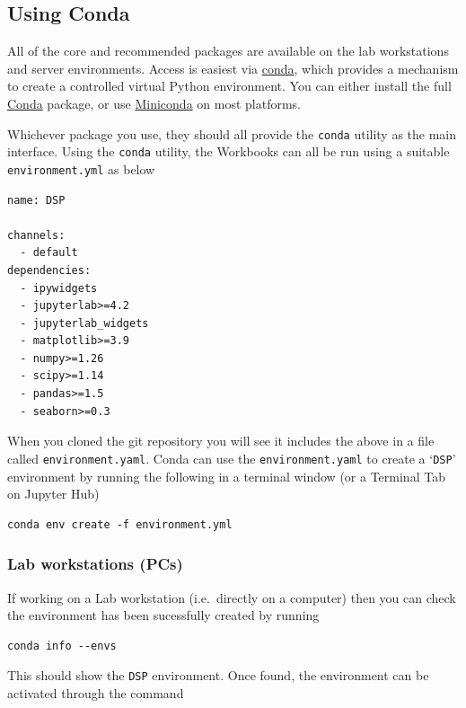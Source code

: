 \subsection{Using Conda}

All of the core and recommended packages are available on the lab
workstations and server environments. Access is easiest via
\href{https://anaconda.org/anaconda/conda}{conda}, which provides a
mechanism to create a controlled virtual Python environment. You can
either install the full
\href{https://docs.conda.io/projects/conda/en/latest/index.html}{Conda}
package, or use
\href{https://www.anaconda.com/docs/getting-started/miniconda/install}{Miniconda}
on most platforms.

Whichever package you use, they should all provide the \texttt{conda}
utility as the main interface. Using the \texttt{conda} utility, the
Workbooks can all be run using a suitable \texttt{environment.yml} as
below

\begin{verbatim}
name: DSP
 
channels:
  - default
dependencies:
  - ipywidgets
  - jupyterlab>=4.2
  - jupyterlab_widgets
  - matplotlib>=3.9
  - numpy>=1.26
  - scipy>=1.14
  - pandas>=1.5
  - seaborn>=0.3
\end{verbatim}

When you cloned the git repository you will see it includes the above in
a file called \texttt{environment.yaml}. Conda can use the
\texttt{environment.yaml} to create a `\texttt{DSP}' environment by
running the following in a terminal window (or a Terminal Tab on Jupyter
Hub)

\begin{verbatim}
conda env create -f environment.yml
\end{verbatim}

\subsubsection{Lab workstations (PCs)}

If working on a Lab workstation (i.e.~directly on a computer) then you
can check the environment has been sucessfully created by running

\begin{verbatim}
conda info --envs
\end{verbatim}

This should show the \texttt{DSP} environment. Once found, the
environment can be activated through the command

